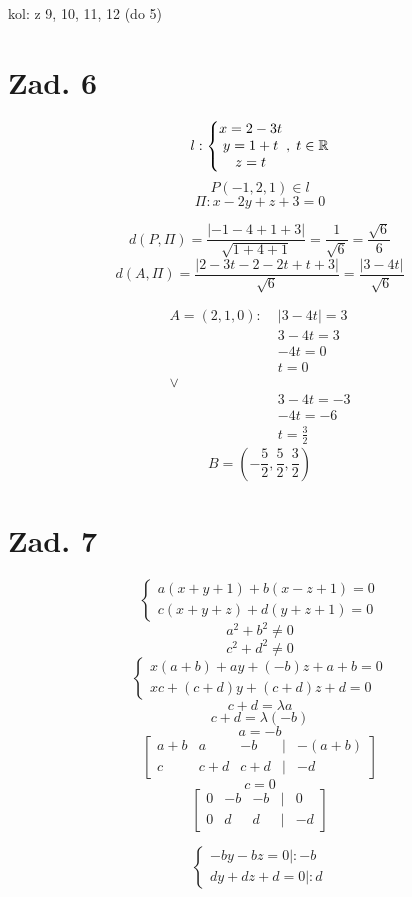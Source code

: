\documentclass[a4paper,fleqn]{article}
\title{}
\author{}
\date{\today}
\begin{document}
	kol: z 9, 10, 11, 12 (do 5)
	\section*{Zad. 6}
	\[ l: \left\{ \begin{matrix} x=2-3t\\ y = 1+t\\ z=t \end{matrix} \right.,\; t\in\mathbb{R} \]
	\[ P(-1,2,1) \in l \]
	\[ \Pi: x-2y+z+3 = 0 \]

	\[ d(P,\Pi) = \frac{ |-1-4+1+3| }{ \sqrt{1+4+1} } = \frac{1}{\sqrt{6}} = \frac{\sqrt{6}} 6 \]
	\[ d(A,\Pi) = \frac{ |2-3t-2-2t+t+3| }{\sqrt 6} = \frac{|3-4t|}{\sqrt 6} \]

	\begin{align*}
		 A = (2,1,0): \;&|3-4t|=3 \\
		 	&3-4t =  3 \\
		 	&-4t = 0 \\
		 	&t= 0 \\
		 	\lor \\
		 	&3-4t = -3 \\
		 	&-4t = -6 \\
		 	&t= \frac 3 2
	\end{align*}
	\[ B = (-\frac 5 2, \frac 5 2, \frac 3 2) \]

	\section*{Zad. 7}
	\[ \left\{ \begin{matrix}
		a(x+y+1)+b(x-z+1) = 0\\
		c(x+y+z)+d(y+z+1) = 0
	\end{matrix}\right. \]
	\[ a^2 + b^2 \neq 0 \]
	\[ c^2 + d^2 \neq 0 \]
	\[ \left\{ \begin{matrix}
		x(a+b) + a y + (-b)z +a + b = 0 \\
		xc + (c+d)y + (c+d)z + d = 0
	\end{matrix}\right. \]
	\[ c+d=\lambda a \]
	\[ c+d = \lambda (-b) \]
	\[a=-b \]
	\[ \begin{bmatrix}
		a+b & a & -b & | & -(a+b) \\
		c & c+d & c+d &|& -d
	\end{bmatrix} \]
	\[ c= 0 \]
	\[ \begin{bmatrix}
		0 & -b & -b & | & 0 \\
		0 & d & d &|& -d
	\end{bmatrix} \]

	\[ \left\{ \begin{matrix}
		-by - bz = 0 | :-b \\
		dy + dz +d = 0 | :d
	\end{matrix}\right. \]
\end{document}
